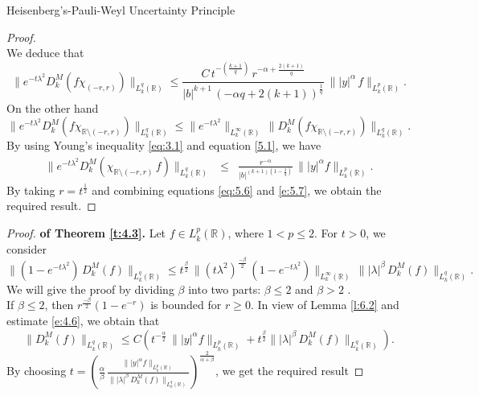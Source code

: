 \documentclass[12pt,a4paper,reqno]{amsproc}
\theoremstyle{definition}
\theoremstyle{remark}
\numberwithin{equation}{section}
\begin{document}
\begin{subsection}{Heisenberg's-Pauli-Weyl Uncertainty Principle}
\begin{proof}
\begin{equation*}
 \end{equation*}
 We deduce that
\begin{equation}\label{eq:5.6}
\|e^{-t\lambda^2} D_k^M\left(f\chi_{(-r,r)}\right) \|_{L_k^{q}(\mathbb{R})} \le  \frac{C\, t^{-\left(\frac{k+1}{q}\right)}\,r^{-\alpha+\frac{2(k+1)}{q}}}{|b|^{k+1}\,(-\alpha q+2(k+1))^{\frac{1}{q}}}\, \||y|^\alpha\,f\|_{L_k^{p}(\mathbb{R})}.   
\end{equation}
On the other hand
 \begin{equation*}
\|e^{-t\lambda^2}D_k^M\left(f\chi_{\mathbb{R}\setminus(-r,r)}\right)\|_{L_k^{q}(\mathbb{R})} \le \|e^{-t\lambda^2}\|_{L^\infty_k(\mathbb{R})}\, \|D_k^M\left(f\chi_{\mathbb{R}\setminus(-r,r)}\right)\|_{L_k^{q}(\mathbb{R})}.
 \end{equation*}
By using Young's inequality \eqref{eq:3.1} and equation \eqref{5.1}, we have
 \begin{eqnarray}\label{e:5.7}
 \|e^{-t\lambda^2}D_k^M\left(\chi_{\mathbb{R}\setminus(-r,r)}\,f\right)\|_{L_k^{q}(\mathbb{R})} &\le&   
 \frac{r^{-\alpha}}{|b|^{(k+1)\left(1-\frac{2}{q}\right)}} \, \||y|^\alpha f\|_{L^p_k(\mathbb{R})}.
 \end{eqnarray}
By taking $r = t^{\frac{1}{2}}$ and combining equations  \eqref{eq:5.6} and \eqref{e:5.7}, we obtain the required result.
\end{proof}
\begin{proof} {\bf of Theorem \ref{t:4.3}.}
    Let $f\in L_k^p(\mathbb{R})$, where $1<p\le 2$. For $t>0$, we consider
\begin{equation} \label{e:4.6}
\|(1-e^{-t\lambda^2})\, D_k^M(f)\|_{L_k^{q}(\mathbb{R})} \le t^{\frac{\beta}{2}}\, \|(t\lambda^2)^{\frac{-\beta}{2}}\, (1-e^{-t\lambda^2})\|_{L_k^\infty(\mathbb{R})}\, \||\lambda|^\beta\, D_k^M(f)\|_{L_k^{q}(\mathbb{R})}. 
\end{equation}
We will give the proof by dividing 
$\beta$ into two parts: $\beta\leq 2$ and $\beta> 2$ . \\
 If $\beta \le 2$, then $r^{\frac{-\beta}{2}}(1-e^{-r})$ is bounded for $r \ge0$. 
In view of  Lemma \ref{l:6.2} and estimate \eqref{e:4.6}, we obtain that
\begin{equation*} 
    \|D_k^M(f)\|_{L_k^{q}(\mathbb{R})}\le C\left( t^{-\frac{\alpha}{2}}\, \| |y|^\alpha f\|_{{L^p_k(\mathbb{R})} }+ t^{\frac{\beta}{2}}\||\lambda|^\beta\, D_k^M(f)\|_{L_k^{q}(\mathbb{R})}\right).
\end{equation*}
By choosing  $t = \left( \frac{\alpha}{\beta}\, \frac{\| |y|^\alpha f\|_{{L^p_k(\mathbb{R})} }}{\||\lambda|^\beta\, D_k^M(f)\|_{L_k^{q}(\mathbb{R})}}\right)^{\frac{2}{\alpha+\beta}}$, we get the required result

\end{proof}
\end{subsection}
\end{document}
